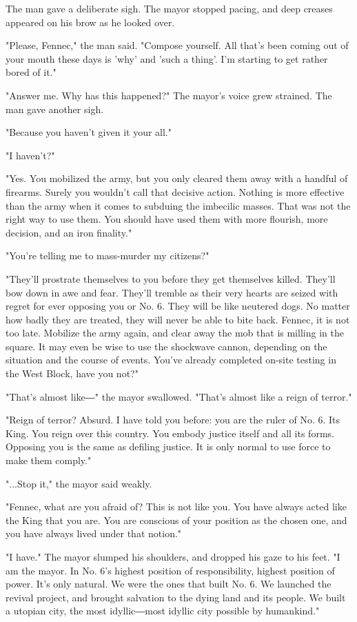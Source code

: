 The man gave a deliberate sigh. The mayor stopped pacing, and deep
creases appeared on his brow as he looked over.

"Please, Fennec," the man said. "Compose yourself. All that's been
coming out of your mouth these days is 'why' and 'such a thing'. I'm
starting to get rather bored of it."

"Answer me. Why has this happened?" The mayor's voice grew strained. The
man gave another sigh.

"Because you haven't given it your all."

"I haven't?"

"Yes. You mobilized the army, but you only cleared them away with a
handful of firearms. Surely you wouldn't call that decisive action.
Nothing is more effective than the army when it comes to subduing the
imbecilic masses. That was not the right way to use them. You should
have used them with more flourish, more decision, and an iron finality."

"You're telling me to mass-murder my citizens?"

"They'll prostrate themselves to you before they get themselves killed.
They'll bow down in awe and fear. They'll tremble as their very hearts
are seized with regret for ever opposing you or No. 6. They will be like
neutered dogs. No matter how badly they are treated, they will never be
able to bite back. Fennec, it is not too late. Mobilize the army again,
and clear away the mob that is milling in the square. It may even be
wise to use the shockwave cannon, depending on the situation and the
course of events. You've already completed on-site testing in the West
Block, have you not?"

"That's almost like―" the mayor swallowed. "That's almost like a reign
of terror."

"Reign of terror? Absurd. I have told you before: you are the ruler of
No. 6. Its King. You reign over this country. You embody justice itself
and all its forms. Opposing you is the same as defiling justice. It is
only normal to use force to make them comply."

"...Stop it," the mayor said weakly.

"Fennec, what are you afraid of? This is not like you. You have always
acted like the King that you are. You are conscious of your position as
the chosen one, and you have always lived under that notion."

"I have." The mayor slumped his shoulders, and dropped his gaze to his
feet. "I am the mayor. In No. 6's highest position of responsibility,
highest position of power. It's only natural. We were the ones that
built No. 6. We launched the revival project, and brought salvation to
the dying land and its people. We built a utopian city, the most
idyllic―most idyllic city possible by humankind."

